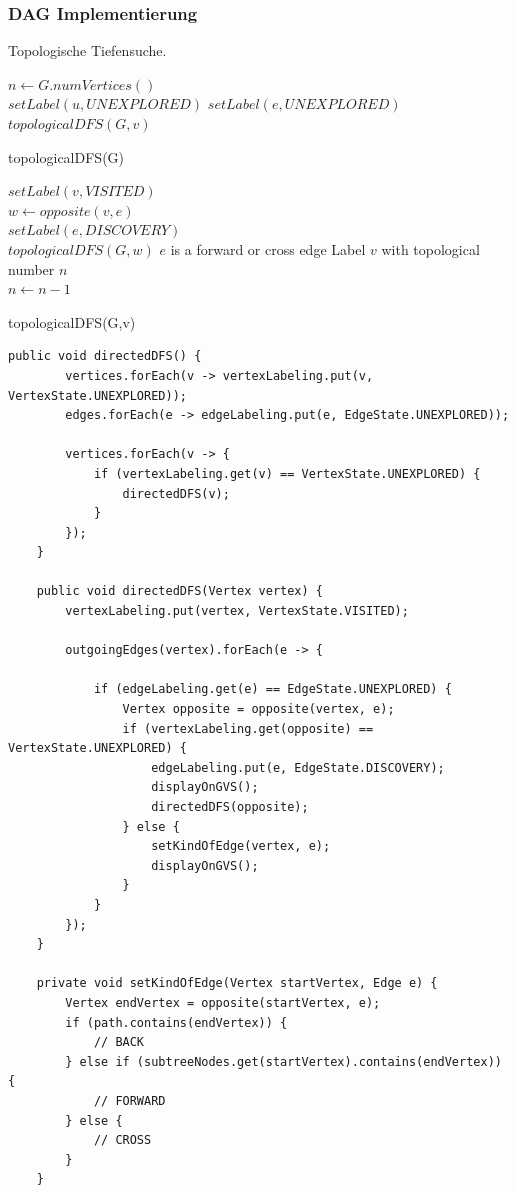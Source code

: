\subsubsection{DAG Implementierung}
Topologische Tiefensuche. \hfill \\
\begin{algorithm}[H]
	$n \leftarrow G.numVertices()$ \\
	{
		$setLabel(u, UNEXPLORED)$
	}
	{
		$setLabel(e, UNEXPLORED)$
	}
	{
		{
			$topologicalDFS(G, v)$
		}
	}
	\caption{topologicalDFS(G)}
\end{algorithm}

\begin{algorithm}[H]
	$setLabel(v, VISITED)$ \\
	{
		{
			$w \leftarrow opposite(v,e)$ \\
			{	
				$setLabel(e, DISCOVERY)$ \\
				$topologicalDFS(G, w)$
			}
			\Else
			{
				$e$ is a forward or cross edge
			}
		}
	}
	Label $v$ with topological number $n$ \\
	$n \leftarrow n - 1$
	\caption{topologicalDFS(G,v)}
\end{algorithm}

\clearpage

\begin{lstlisting}[caption=Directed DFS in Java]
	public void directedDFS() {
		vertices.forEach(v -> vertexLabeling.put(v, VertexState.UNEXPLORED));
		edges.forEach(e -> edgeLabeling.put(e, EdgeState.UNEXPLORED));
		
		vertices.forEach(v -> {
			if (vertexLabeling.get(v) == VertexState.UNEXPLORED) {
				directedDFS(v);
			}
		});
	}
	
	public void directedDFS(Vertex vertex) {
		vertexLabeling.put(vertex, VertexState.VISITED);
		
		outgoingEdges(vertex).forEach(e -> {
			
			if (edgeLabeling.get(e) == EdgeState.UNEXPLORED) {		
				Vertex opposite = opposite(vertex, e);
				if (vertexLabeling.get(opposite) == VertexState.UNEXPLORED) {
					edgeLabeling.put(e, EdgeState.DISCOVERY);
					displayOnGVS();
					directedDFS(opposite);
				} else {
					setKindOfEdge(vertex, e);
					displayOnGVS();
				}
			}
		});
	}
	
	private void setKindOfEdge(Vertex startVertex, Edge e) {
		Vertex endVertex = opposite(startVertex, e);
		if (path.contains(endVertex)) {
			// BACK
		} else if (subtreeNodes.get(startVertex).contains(endVertex)) {
			// FORWARD
		} else {
			// CROSS
		}
	}
\end{lstlisting}


